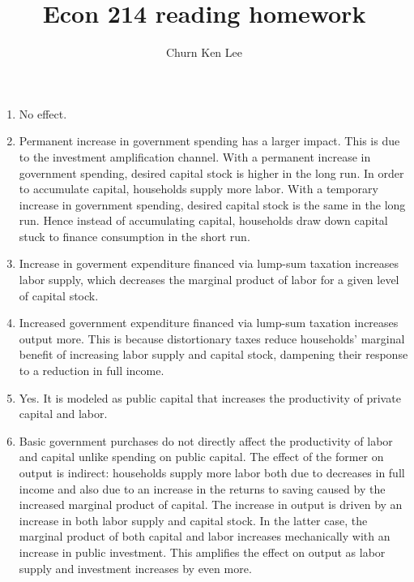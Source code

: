 \documentclass[12pt]{article}
\title{Econ 214 reading homework}
\author{Churn Ken Lee}
\date{}
\begin{document}
\maketitle

\section{\cite{baxter_king_1993}}
\begin{enumerate}
    \item No effect.
    \item Permanent increase in government spending has a larger impact. 
    This is due to the investment amplification channel. 
    With a permanent increase in government spending, desired capital stock is higher in the long run.
    In order to accumulate capital, households supply more labor.
    With a temporary increase in government spending, desired capital stock is the same in the long run.
    Hence instead of accumulating capital, households draw down capital stuck to finance consumption in the short run.
    \item Increase in goverment expenditure financed via lump-sum taxation increases labor supply, which decreases the marginal product of labor for a given level of capital stock.
    \item Increased government expenditure financed via lump-sum taxation increases output more. This is because distortionary taxes reduce households' marginal benefit of increasing labor supply and capital stock, dampening their response to a reduction in full income.
    \item Yes.
    It is modeled as public capital that increases the productivity of private capital and labor.
    \item Basic government purchases do not directly affect the productivity of labor and capital unlike spending on public capital.
    The effect of the former on output is indirect: households supply more labor both due to decreases in full income and also due to an increase in the returns to saving caused by the increased marginal product of capital.
    The increase in output is driven by an increase in both labor supply and capital stock.
    In the latter case, the marginal product of both capital and labor increases mechanically with an increase in public investment.
    This amplifies the effect on output as labor supply and investment increases by even more.
\end{enumerate}
\end{document}
